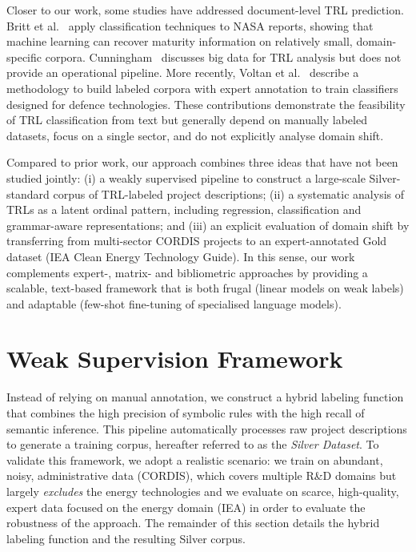 \documentclass[runningheads]{llncs}
\begin{document}
Closer to our work, some studies have addressed document-level TRL prediction.
Britt et al.~\cite{britt2008} apply classification techniques to NASA
reports, showing that machine learning can recover maturity information on
relatively small, domain-specific corpora. Cunningham~\cite{cunningham2014}
discusses big data for TRL analysis but does not provide %
an operational pipeline. More recently, Voltan et al.~\cite{Voltan2024} describe
a methodology to build labeled corpora with expert annotation to train classifiers designed for defence technologies. %
These contributions demonstrate the feasibility of TRL classification from text but generally depend on manually labeled datasets, focus on a single sector, and
do not explicitly analyse domain shift.

Compared to prior work, our approach combines three ideas that %
have not been studied jointly: (i) a weakly supervised pipeline to
construct a large-scale Silver-standard corpus of TRL-labeled project
descriptions; (ii) a systematic analysis of TRLs as a latent
ordinal pattern, including regression, classification and grammar-aware
representations; and (iii) an explicit evaluation of domain shift by
transferring from multi-sector CORDIS projects to an expert-annotated Gold
dataset (IEA Clean Energy Technology Guide). In this sense, our work
complements expert-, matrix- and bibliometric approaches by providing a
scalable, text-based framework that is both frugal (linear models on weak
labels) and adaptable (few-shot fine-tuning of specialised language models).

\section{Weak Supervision Framework}

Instead of relying on manual annotation, we construct a hybrid labeling function
that combines the high precision of symbolic rules with the high recall of
semantic inference. This pipeline automatically processes raw project
descriptions to generate a training corpus, hereafter referred to as the
\emph{Silver Dataset}.
To validate this framework, we adopt a realistic scenario: we train on abundant, noisy, administrative data (CORDIS), which covers multiple R\&D domains but largely \emph{excludes} the energy technologies %
and we evaluate on scarce, high-quality, expert data focused on the energy domain (IEA) in order to evaluate the robustness of the approach. %
The remainder of this section details the hybrid labeling function and the resulting Silver corpus.
\end{document}
